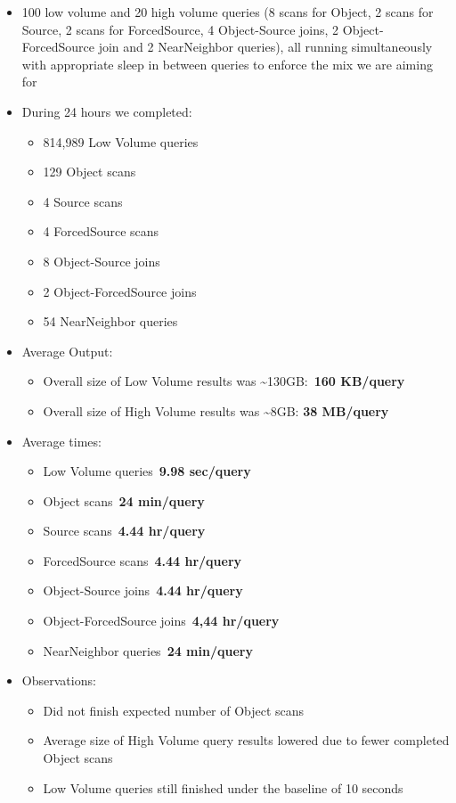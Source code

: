 \begin{itemize}
\item
  100 low volume and 20 high volume queries (8 scans for Object, 2 scans
  for Source, 2 scans for ForcedSource, 4 Object-Source joins, 2
  Object-ForcedSource join and 2 NearNeighbor queries), all running
  simultaneously with appropriate sleep in between queries to enforce
  the mix we are aiming for
\item
  During 24 hours we completed:

  \begin{itemize}
  \item
    814,989 Low Volume queries
  \item
    129 Object scans
  \item
    4 Source scans
  \item
    4 ForcedSource scans
  \item
    8 Object-Source joins
  \item
    2 Object-ForcedSource joins
  \item
    54 NearNeighbor queries
  \end{itemize}
\item
  Average Output:

  \begin{itemize}
  \item
    Overall size of Low Volume results was
    \textasciitilde{}130GB:~\textbf{160 KB/query}
  \item
    Overall size of High Volume results was \textasciitilde{}8GB:
    \textbf{38 MB/query}
  \end{itemize}
\item
  Average times:

  \begin{itemize}
  \item
    Low Volume queries~\textbf{9.98 sec/query}
  \item
    Object scans~\textbf{24 min/query}
  \item
    Source scans~\textbf{4.44 hr/query}
  \item
    ForcedSource scans~\textbf{4.44 hr/query}
  \item
    Object-Source joins~\textbf{4.44 hr/query}
  \item
    Object-ForcedSource joins~\textbf{4,44 hr/query}
  \item
    NearNeighbor queries~\textbf{24 min/query}
  \end{itemize}
\item
  Observations:

  \begin{itemize}
  \item
    Did not finish expected number of Object scans
  \item
    Average size of High Volume query results lowered due to fewer
    completed Object scans
  \item
    Low Volume queries still finished under the baseline of 10 seconds
  \end{itemize}
\end{itemize}

